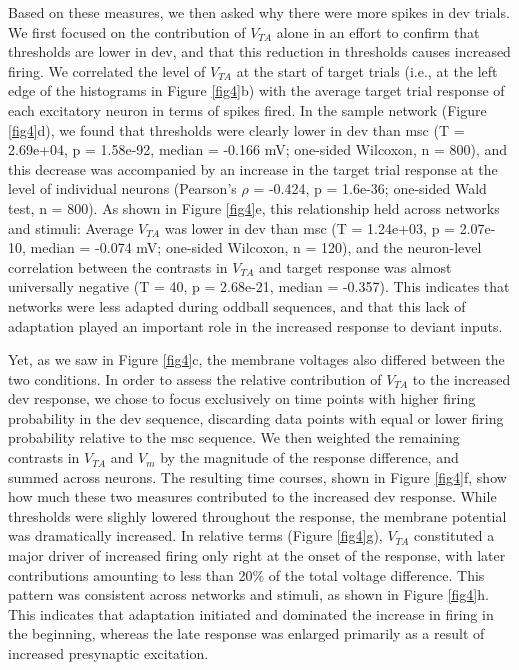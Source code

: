 \documentclass[pdflatex,referee,iicol,sn-basic]{sn-jnl}
\theoremstyle{thmstyleone}%
\theoremstyle{thmstyletwo}%
\theoremstyle{thmstylethree}%
\begin{document}
Based on these measures, we then asked why there were more spikes in dev trials. We first focused on the contribution of $V_{TA}$ alone in an effort to confirm that thresholds are lower in dev, and that this reduction in thresholds causes increased firing. We correlated the level of $V_{TA}$ at the start of target trials (i.e., at the left edge of the histograms in Figure \ref{fig4}b) with the average target trial response of each excitatory neuron in terms of spikes fired. In the sample network (Figure \ref{fig4}d), we found that thresholds were clearly lower in dev than msc (T = 2.69e+04, p = 1.58e-92, median = -0.166 mV; one-sided Wilcoxon, n = 800), and this decrease was accompanied by an increase in the target trial response at the level of individual neurons (Pearson's $\rho$ = -0.424, p = 1.6e-36; one-sided Wald test, n = 800). As shown in Figure \ref{fig4}e, this relationship held across networks and stimuli: Average $V_{TA}$ was lower in dev than msc (T = 1.24e+03, p = 2.07e-10, median = -0.074 mV; one-sided Wilcoxon, n = 120), and the neuron-level correlation between the contrasts in $V_{TA}$ and target response was almost universally negative (T = 40, p = 2.68e-21, median = -0.357). This indicates that networks were less adapted during oddball sequences, and that this lack of adaptation played an important role in the increased response to deviant inputs.

Yet, as we saw in Figure \ref{fig4}c, the membrane voltages also differed between the two conditions. In order to assess the relative contribution of $V_{TA}$ to the increased dev response, we chose to focus exclusively on time points with higher firing probability in the dev sequence, discarding data points with equal or lower firing probability relative to the msc sequence. We then weighted the remaining contrasts in $V_{TA}$ and $V_m$ by the magnitude of the response difference, and summed across neurons. The resulting time courses, shown in Figure \ref{fig4}f, show how much these two measures contributed to the increased dev response. While thresholds were slighly lowered throughout the response, the membrane potential was dramatically increased. In relative terms (Figure \ref{fig4}g), $V_{TA}$ constituted a major driver of increased firing only right at the onset of the response, with later contributions amounting to less than 20\% of the total voltage difference. This pattern was consistent across networks and stimuli, as shown in Figure \ref{fig4}h. This indicates that adaptation initiated and dominated the increase in firing in the beginning, whereas the late response was enlarged primarily as a result of increased presynaptic excitation.
\end{document}
